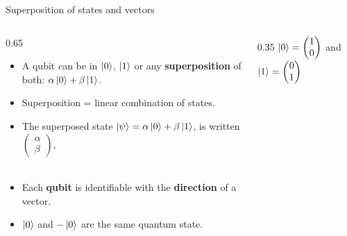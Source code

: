 \documentclass[aspectratio=169,12pt]{beamer}
\begin{document}
\begin{frame}{Superposition of states and vectors}
  \begin{columns}[T]
    \begin{column}{0.65\textwidth}
      \begin{itemize}[<+->]
        \item A qubit can be in $\ket 0$, $\ket 1$ or any \textbf{superposition} of both: $\alpha \ket 0 + \beta \ket 1$.
        \item Superposition = linear combination of states.
        \item The superposed state $\ket {\psi} = \alpha \ket 0 + \beta \ket 1$, is written $\begin{pmatrix} \alpha \\ \beta \end{pmatrix}$,\\~\\
        \item Each \textbf{qubit} is identifiable with the \textbf{direction} of a vector.
        \item $\ket{0}$ and $-\ket{0}$ are the same quantum state.
      \end{itemize}
    \end{column}
    \begin{column}{0.35\textwidth}
      \vspace{2em}
      \centering
      $\ket 0 = \begin{pmatrix}1 \\ 0\end{pmatrix}$ and $\ket 1 = \begin{pmatrix}0 \\ 1\end{pmatrix}$\\~\\~\\
\end{column}
\end{columns}
\end{frame}
\end{document}
